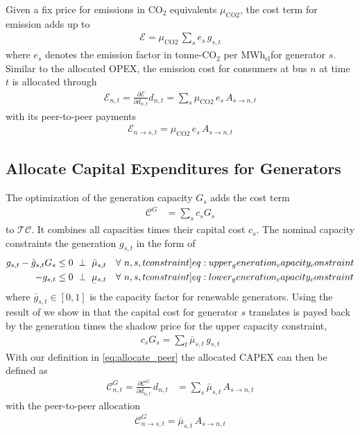 \documentclass[11pt,twocolumn]{article}
\newcommand{\ubar}[1]{\underaccent{\bar}{#1}}
\newcommand{\resultsin}[1]{\hspace{6pt} \bot  \hspace{6pt} #1}
\newcommand{\Forall}[1]{\hspace{10pt} \forall \,\, #1 }
\newcommand{\pdv}[2]{\frac{\partial #1}{\partial #2}}
\newcommand{\generation}{g_{s,t}}
\newcommand{\generationpotential}{\bar{g}_{s,t}}
\newcommand{\capacityGeneration}{G_{s}}
\newcommand{\capexGeneration}{c_{s}}
\newcommand{\demand}[1][n]{d_{#1,t}}
\newcommand{\mulowergeneration}{\ubar{\mu}_{s,t}}
\newcommand{\muuppergeneration}{\bar{\mu}_{s,t}}
\newcommand{\allocatePeer}[1][s \rightarrow n]{A_{#1,t}}
\newcommand{\allocateCapexGeneration}[1][n]{\mathcal{C}^{G}_{#1,t}}
\newcommand{\allocateEmissionCost}[1][n]{\mathcal{E}_{#1,t}}
\newcommand{\emission}{e_{s}}
\newcommand{\emissionPrice}{\mu_{\text{CO2}}}
\newcommand{\megawatthour}{MWh$_\text{el}$}
\newcommand{\totalcost}{\mathcal{TC}}
\newcommand{\totalCapexGeneration}{\mathcal{C}^G}
\newcommand{\totalEmissionCost}{\mathcal{E}}
\begin{document}
Given a fix price for emissions in CO$_2$ equivalents $\emissionPrice$, the cost term for emission adds up to 
\begin{align}
 \totalEmissionCost = \emissionPrice \, \sum_s  \emission \, \generation
\end{align}
where $\emission$ denotes the emission factor in tonne-CO$_2$ per \megawatthour for generator $s$.
Similar to the allocated OPEX, the emission cost for consumers at bus $n$ at time $t$ is allocated through
\begin{align}
 \allocateEmissionCost = \pdv{\totalEmissionCost}{\demand} \demand = \sum_s \emissionPrice \, \emission \, \allocatePeer  
\end{align}
with its peer-to-peer payments 
\begin{align}
 \allocateEmissionCost[n \rightarrow s] = \emissionPrice \, \emission \, \allocatePeer
\end{align}


\subsection{Allocate Capital Expenditures for Generators}

The optimization of the generation capacity $\capacityGeneration$ adds the cost term 
\begin{align}
 \totalCapexGeneration& = \sum_{s} \capexGeneration \capacityGeneration 
\end{align}
to $\totalcost$. It combines all capacities times their capital cost $\capexGeneration$. The nominal capacity constraints the generation $\generation$ in the form of 
\begin{align}
\generation - \generationpotential \capacityGeneration  &\le 0 \resultsin{\muuppergeneration} \Forall{n,s,t} 
\label[constraint]{eq:upper_generation_capacity_constraint}\\ 
- \generation &\le 0 \resultsin{\mulowergeneration} \Forall{n,s,t} 
\label[constraint]{eq:lower_generation_capacity_constraint}
\end{align}
where $\generationpotential \in \left[ 0,1\right]$ is the capacity factor for renewable generators. Using the result of \cite{brown_decreasing_2020} we show in that the capital cost  for generator $s$ translates is payed back by the generation times the shadow price for the upper capacity constraint, 
\begin{align}
 \capexGeneration \capacityGeneration = \sum_t \muuppergeneration \,  \generation 
 \label{eq:no_profit_capex_generation}
\end{align}
With our definition in \cref{eq:allocate_peer} the allocated CAPEX can then be defined as 
\begin{align}
\allocateCapexGeneration = \pdv{\totalCapexGeneration}{\demand} \, \demand & = \sum_{s} \muuppergeneration \, \allocatePeer
\end{align}
with the peer-to-peer allocation 
\begin{align}
 \allocateCapexGeneration[n \rightarrow s] = \muuppergeneration \, \allocatePeer
 \label{eq:allocate_capexGeneration_detailed}
\end{align}
\end{document}
